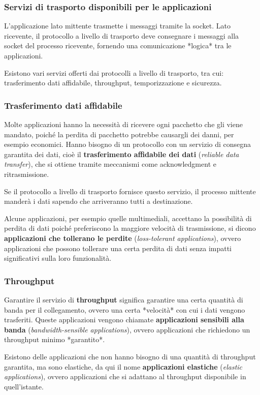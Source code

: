 \subsubsection{Servizi di trasporto disponibili per le applicazioni}
L'applicazione lato mittente trasmette i messaggi tramite la socket. Lato ricevente, il protocollo a livello di trasporto deve consegnare i messaggi alla socket del processo ricevente, fornendo una comunicazione *logica* tra le applicazioni.

Esistono vari servizi offerti dai protocolli a livello di trasporto, tra cui: trasferimento dati affidabile, throughput, temporizzazione e sicurezza.

\subsubsection*{Trasferimento dati affidabile}
Molte applicazioni hanno la necessità di ricevere ogni pacchetto che gli viene mandato, poiché la perdita di pacchetto potrebbe causargli dei danni, per esempio economici. Hanno bisogno di un protocollo con un servizio di consegna garantita dei dati, cioè il \textbf{trasferimento affidabile dei dati} (\textit{reliable data transfer}), che si ottiene tramite meccanismi come acknowledgment e ritrasmissione.

Se il protocollo a livello di trasporto fornisce questo servizio, il processo mittente manderà i dati sapendo che arriveranno tutti a destinazione.

Alcune applicazioni, per esempio quelle multimediali, accettano la possibilità di perdita di dati poiché preferiscono la maggiore velocità di trasmissione, si dicono \textbf{applicazioni che tollerano le perdite} (\textit{loss-tolerant applications}), ovvero applicazioni che possono tollerare una certa perdita di dati senza impatti significativi sulla loro funzionalità.

\subsubsection*{Throughput}
Garantire il servizio di \textbf{throughput} significa garantire una certa quantità di banda per il collegamento, ovvero una certa *velocità* con cui i dati vengono trasferiti. Queste applicazioni vengono chiamate \textbf{applicazioni sensibili alla banda} (\textit{bandwidth-sensible applications}), ovvero applicazioni che richiedono un throughput minimo *garantito*.

Esistono delle applicazioni che non hanno bisogno di una quantità di throughput garantita, ma sono elastiche, da qui il nome \textbf{applicazioni elastiche} (\textit{elastic applications}), ovvero applicazioni che si adattano al throughput disponibile in quell'istante.

